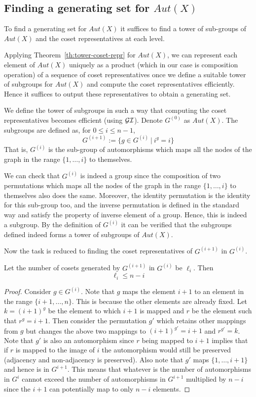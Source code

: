 \subsection{Finding a generating set for $Aut(X)$}
To find a generating set for $Aut(X)$ it suffices to find a tower of
sub-groups of $Aut(X)$ and the coset representatives at each level.

Applying Theorem~\ref{th:tower-coset-repr} for $Aut(X)$, we can represent each
element of $Aut(X)$ uniquely as a product (which in our case is composition
operation) of a sequence of coset representatives once we define a
suitable tower of subgroups for $Aut(X)$ and compute the coset representatives
efficiently. Hence it suffices to output these representatives to obtain a
generating set.

We define the tower of subgroups in such a way that computing the coset
representatives becomes efficient (using $\cal{GI}$). Denote $G^{(0)}$ as
$Aut(X)$. The subgroups are defined as, for $0 \le i \le n-1$,
$$G^{(i+1)} := \{ g \in G^{(i)} ~|~ i^{g} = i\}$$
That is, $G^{(i)}$ is the sub-group of automorphisms which maps all the nodes
of the graph in the range $\{1, \ldots, i\}$ to themselves. 

We can check that $G^{(i)}$ is indeed a group since the composition of two
permutations which maps all the nodes of the graph in the range $\{1, \ldots,
i\}$ to themselves also does the same. Moreover, the
identity permutation is the identity for this sub-group too, and the inverse
permutation is defined in the standard way and satisfy the property of inverse
element of a group. 
Hence, this is indeed a subgroup. By the definition of $G^{(i)}$ it can be
verified that the subgroups defined indeed forms a tower of subgroups of
$Aut(X)$.

Now the task is reduced to finding the coset representatives of $G^{(i+1)}$ in
$G^{(i)}$.  

\begin{claim}
Let the number of cosets generated by $G^{(i+1)}$ in $G^{(i)}$ be
$\ell_{i}$. Then $$\ell_{i} \le n-i$$
\end{claim}
\begin{proof}
Consider $g \in G^{(i)}$. Note that $g$ maps the element $i+1$ to an
element in the range $\{i+1, \ldots, n\}$. This is because the other elements
are already fixed. Let $k = (i+1)^{g}$ be the element to which $i+1$ is mapped
and $r$ be the element such that $r^{g}= i+1$. Then consider the permutation
$g'$ which retains other mappings from $g$ but changes the above two mappings
to $(i+1)^{g'} = i+1$ and $r^{g'} = k$. Note that $g'$ is also an automorphism
since $r$ being mapped to $i+1$ implies that if $r$ is mapped to the image of
$i$ the automorphism would still be preserved (adjacency and non-adjacency is
preserved). Also note that $g'$ maps $\{1, \ldots , i+1\}$ and hence is in
$G^{i+1}$. This means that whatever is the number of automorphisms in $G^{i}$
cannot exceed the number of automorphisms in $G^{i+1}$ multiplied by $n-i$
since the $i+1$ can potentially map to only $n-i$ elements.  
\end{proof}

